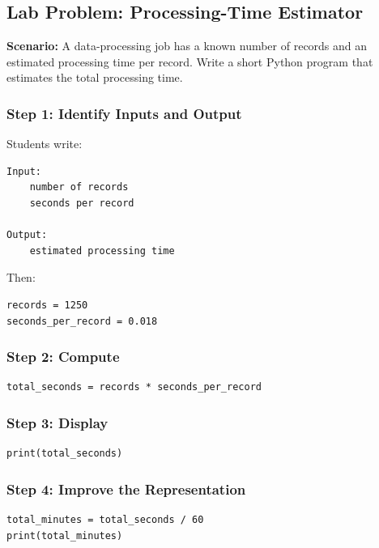 \documentclass[11pt]{article}
\begin{document}
\subsection*{Lab Problem: Processing-Time Estimator}

\textbf{Scenario:} A data-processing job has a known number of records and an estimated processing time per record. Write a short Python program that estimates the total processing time.

\subsubsection*{Step 1: Identify Inputs and Output}

Students write:

\begin{verbatim}
Input:
    number of records
    seconds per record

Output:
    estimated processing time
\end{verbatim}

Then:

\begin{lstlisting}
records = 1250
seconds_per_record = 0.018
\end{lstlisting}

\subsubsection*{Step 2: Compute}

\begin{lstlisting}
total_seconds = records * seconds_per_record
\end{lstlisting}

\subsubsection*{Step 3: Display}

\begin{lstlisting}
print(total_seconds)
\end{lstlisting}

\subsubsection*{Step 4: Improve the Representation}

\begin{lstlisting}
total_minutes = total_seconds / 60
print(total_minutes)
\end{lstlisting}
\end{document}
